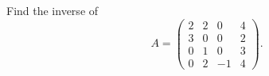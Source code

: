 \documentclass{ximera}
\author{Parisa Fatheddin}
\begin{document}
\begin{exercise}
Find the inverse of 
\[A = \left(\begin{array}{cccc}
2 & 2 & 0 & 4\\
3 & 0 &0& 2\\
0& 1 & 0 & 3\\
0 & 2 & -1 & 4
\end{array}\right).
\]

\end{exercise} 
\end{document}

